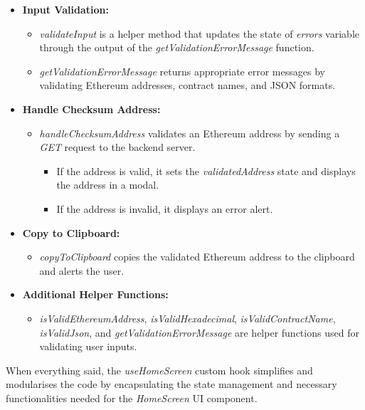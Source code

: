 \begin{itemize}
    \item \textbf{Input Validation:}
    \begin{itemize}
        \item \textit{validateInput} is a helper method that updates the state of \textit{errors} variable through the output of the \textit{getValidationErrorMessage} function.
        \item \textit{getValidationErrorMessage} returns appropriate error messages by validating Ethereum addresses, contract names, and JSON formats.
    \end{itemize}

    \item \textbf{Handle Checksum Address:}
    \begin{itemize}
        \item \textit{handleChecksumAddress} validates an Ethereum address by sending a \textit{GET} request to the backend server.
        \begin{itemize}
            \item If the address is valid, it sets the \textit{validatedAddress} state and displays the address in a modal.
            \item If the address is invalid, it displays an error alert.
        \end{itemize}
    \end{itemize}

    \item \textbf{Copy to Clipboard:}
    \begin{itemize}
        \item \textit{copyToClipboard} copies the validated Ethereum address to the clipboard and alerts the user.
    \end{itemize}

    \item \textbf{Additional Helper Functions:}
    \begin{itemize}
        \item \textit{isValidEthereumAddress}, \textit{isValidHexadecimal}, \textit{isValidContractName}, \textit{isValidJson}, and \textit{getValidationErrorMessage} are helper functions used for validating user inputs.
    \end{itemize}
\end{itemize}

When everything said, the \textit{useHomeScreen} custom hook simplifies and modularises the code by encapsulating the state management and necessary functionalities needed for the \textit{HomeScreen} UI component.

